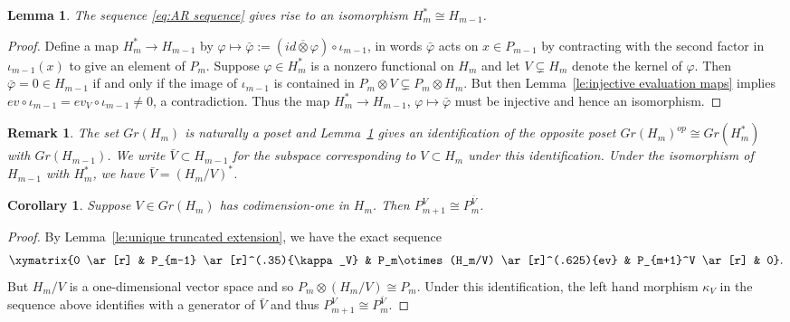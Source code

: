 \documentclass{amsart}
\newcommand{\sayT}[1]{\say[T]{#1}}
\newtheorem{corollary}[theorem]{Corollary}
\newtheorem{lemma}[theorem]{Lemma}
\newtheorem{remark}[theorem]{Remark}
\begin{document}
\begin{lemma}
  \label{le:preprojective homomorphism duality}
  The sequence \eqref{eq:AR sequence} gives rise to an isomorphism $H_m^*\cong H_{m-1}$.
\end{lemma}
\begin{proof}
  Define a map $H_m^*\to H_{m-1}$ by $\varphi\mapsto\bar{\varphi}:=(id\overline{\otimes}\varphi)\circ\iota_{m-1}$, in words $\bar{\varphi}$ acts on $x\in P_{m-1}$ by contracting with the second factor in $\iota_{m-1}(x)$ to give an element of $P_m$.
  Suppose $\varphi\in H_m^*$ is a nonzero functional on $H_m$ and let $V\subsetneq H_m$ denote the kernel of $\varphi$.
  Then $\bar{\varphi}=0\in H_{m-1}$ if and only if the image of $\iota_{m-1}$ is contained in $P_m\otimes V\subsetneq P_m\otimes H_m$.
  But then Lemma~\ref{le:injective evaluation maps} implies $ev\circ\iota_{m-1}=ev_V\circ\iota_{m-1}\ne0$, a contradiction.
  Thus the map $H_m^*\to H_{m-1}$, $\varphi\mapsto\bar{\varphi}$ must be injective and hence an isomorphism.
\end{proof}
\begin{remark}
  The set $Gr(H_m)$ is naturally a poset and Lemma~\ref{le:preprojective homomorphism duality} gives an identification of the opposite poset $Gr(H_m)^{op}\cong Gr(H_m^*)$ with $Gr(H_{m-1})$.
  We write $\bar{V}\subset H_{m-1}$ for the subspace corresponding to $V\subset H_m$ under this identification.
  Under the isomorphism of $H_{m-1}$ with $H_m^*$, we have $\bar{V}=(H_m/V)^*$.\sayT{more details?}
\end{remark}

\begin{corollary}
  \label{cor:truncated preprojective isomorphism}
  Suppose $V\in Gr(H_m)$ has codimension-one in $H_m$.  Then $P_{m+1}^V\cong P_m^{\bar{V}}$.
\end{corollary}
\begin{proof}
  By Lemma~\ref{le:unique truncated extension}, we have the exact sequence
  \[\xymatrix{0 \ar[r] & P_{m-1} \ar[r]^(.35){\kappa_V} & P_m\otimes(H_m/V) \ar[r]^(.625){ev} & P_{m+1}^V \ar[r] & 0}.\]
  But $H_m/V$ is a one-dimensional vector space and so $P_m\otimes(H_m/V)\cong P_m$.
  Under this identification, the left hand morphism $\kappa_V$ in the sequence above identifies with a generator of $\bar{V}$ and thus $P_{m+1}^V\cong P_m^{\bar{V}}$.
\end{proof}
\end{document}
